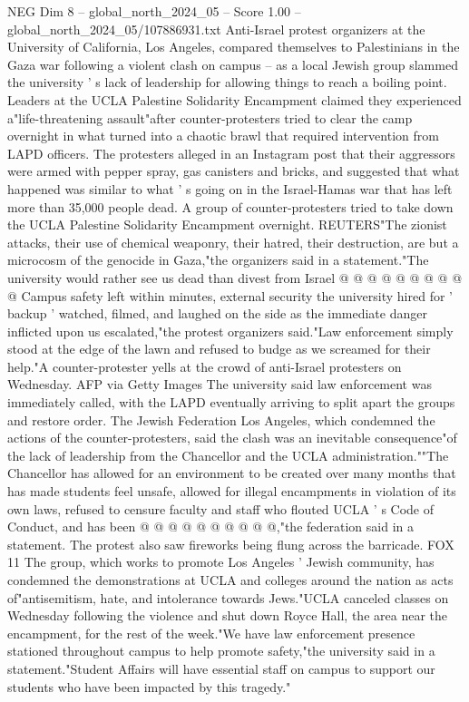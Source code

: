 \begin{textsample}{NEG Dim 8 – global\_north\_2024\_05 – Score 1.00 – global\_north\_2024\_05/107886931.txt}  \label{ex:f8_neg_388}
Anti-Israel protest organizers at the University of California, Los Angeles, compared themselves to Palestinians in the Gaza war following a violent clash on campus -- as a local Jewish group slammed the university ' s lack of leadership for allowing things to reach a boiling point.
Leaders at the UCLA Palestine Solidarity Encampment claimed they experienced a"life-threatening assault"after counter-protesters tried to clear the camp overnight in what turned into a chaotic brawl that required intervention from LAPD officers.
The protesters alleged in an Instagram post that their aggressors were armed with pepper spray, gas canisters and bricks, and suggested that what happened was similar to what ' s going on in the Israel-Hamas war that has left more than 35,000 people dead.
A group of counter-protesters tried to take down the UCLA Palestine Solidarity Encampment overnight.
REUTERS"The zionist attacks, their use of chemical weaponry, their hatred, their destruction, are but a microcosm of the genocide in Gaza,"the organizers said in a statement."The university would rather see us dead than divest from Israel @ @ @ @ @ @ @ @ @ @ Campus safety left within minutes, external security the university hired for ' backup ' watched, filmed, and laughed on the side as the immediate danger inflicted upon us escalated,"the protest organizers said."Law enforcement simply stood at the edge of the lawn and refused to budge as we screamed for their help."A counter-protester yells at the crowd of anti-Israel protesters on Wednesday.
AFP via Getty Images The university said law enforcement was immediately called, with the LAPD eventually arriving to split apart the groups and restore order.
The Jewish Federation Los Angeles, which condemned the actions of the counter-protesters, said the clash was an inevitable consequence"of the lack of leadership from the Chancellor and the UCLA administration.""The Chancellor has allowed for an environment to be created over many months that has made students feel unsafe, allowed for illegal encampments in violation of its own laws, refused to censure faculty and staff who flouted UCLA ' s Code of Conduct, and has been @ @ @ @ @ @ @ @ @ @,"the federation said in a statement.
The protest also saw fireworks being flung across the barricade.
FOX 11 The group, which works to promote Los Angeles ' Jewish community, has condemned the demonstrations at UCLA and colleges around the nation as acts of"antisemitism, hate, and intolerance towards Jews."UCLA canceled classes on Wednesday following the violence and shut down Royce Hall, the area near the encampment, for the rest of the week."We have law enforcement presence stationed throughout campus to help promote safety,"the university said in a statement."Student Affairs will have essential staff on campus to support our students who have been impacted by this tragedy."

\end{textsample}
